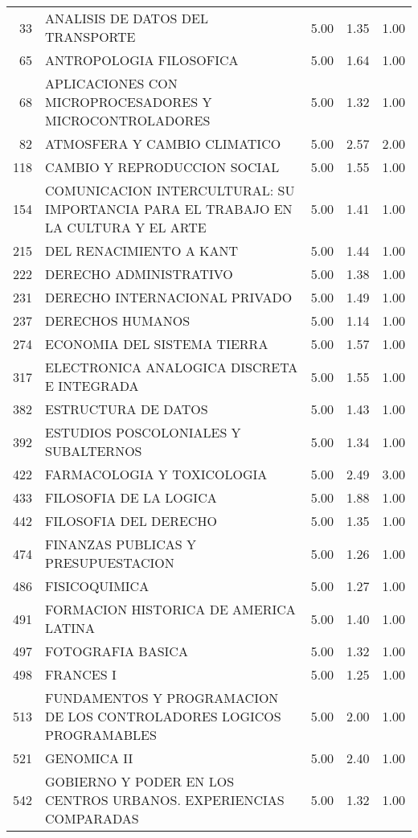 \begin{table}[ht]
\begin{tabular}{rlrrr}
  33 & ANALISIS DE DATOS DEL TRANSPORTE & 5.00 & 1.35 & 1.00 \\ 
  65 & ANTROPOLOGIA FILOSOFICA & 5.00 & 1.64 & 1.00 \\ 
  68 & APLICACIONES CON MICROPROCESADORES Y MICROCONTROLADORES & 5.00 & 1.32 & 1.00 \\ 
  82 & ATMOSFERA Y CAMBIO CLIMATICO & 5.00 & 2.57 & 2.00 \\ 
  118 & CAMBIO Y REPRODUCCION SOCIAL & 5.00 & 1.55 & 1.00 \\ 
  154 & COMUNICACION INTERCULTURAL: SU IMPORTANCIA PARA EL TRABAJO EN LA CULTURA Y EL ARTE & 5.00 & 1.41 & 1.00 \\ 
  215 & DEL RENACIMIENTO A KANT & 5.00 & 1.44 & 1.00 \\ 
  222 & DERECHO ADMINISTRATIVO & 5.00 & 1.38 & 1.00 \\ 
  231 & DERECHO INTERNACIONAL PRIVADO & 5.00 & 1.49 & 1.00 \\ 
  237 & DERECHOS HUMANOS & 5.00 & 1.14 & 1.00 \\ 
  274 & ECONOMIA DEL SISTEMA TIERRA & 5.00 & 1.57 & 1.00 \\ 
  317 & ELECTRONICA ANALOGICA DISCRETA E INTEGRADA & 5.00 & 1.55 & 1.00 \\ 
  382 & ESTRUCTURA DE DATOS & 5.00 & 1.43 & 1.00 \\ 
  392 & ESTUDIOS POSCOLONIALES Y SUBALTERNOS & 5.00 & 1.34 & 1.00 \\ 
  422 & FARMACOLOGIA Y TOXICOLOGIA & 5.00 & 2.49 & 3.00 \\ 
  433 & FILOSOFIA DE LA LOGICA & 5.00 & 1.88 & 1.00 \\ 
  442 & FILOSOFIA DEL DERECHO & 5.00 & 1.35 & 1.00 \\ 
  474 & FINANZAS PUBLICAS Y PRESUPUESTACION & 5.00 & 1.26 & 1.00 \\ 
  486 & FISICOQUIMICA & 5.00 & 1.27 & 1.00 \\ 
  491 & FORMACION HISTORICA DE AMERICA LATINA & 5.00 & 1.40 & 1.00 \\ 
  497 & FOTOGRAFIA BASICA & 5.00 & 1.32 & 1.00 \\ 
  498 & FRANCES I & 5.00 & 1.25 & 1.00 \\ 
  513 & FUNDAMENTOS Y PROGRAMACION DE LOS CONTROLADORES LOGICOS PROGRAMABLES & 5.00 & 2.00 & 1.00 \\ 
  521 & GENOMICA II & 5.00 & 2.40 & 1.00 \\ 
  542 & GOBIERNO Y PODER EN LOS CENTROS URBANOS. EXPERIENCIAS COMPARADAS & 5.00 & 1.32 & 1.00 \\ 

\end{tabular}
\end{table}
